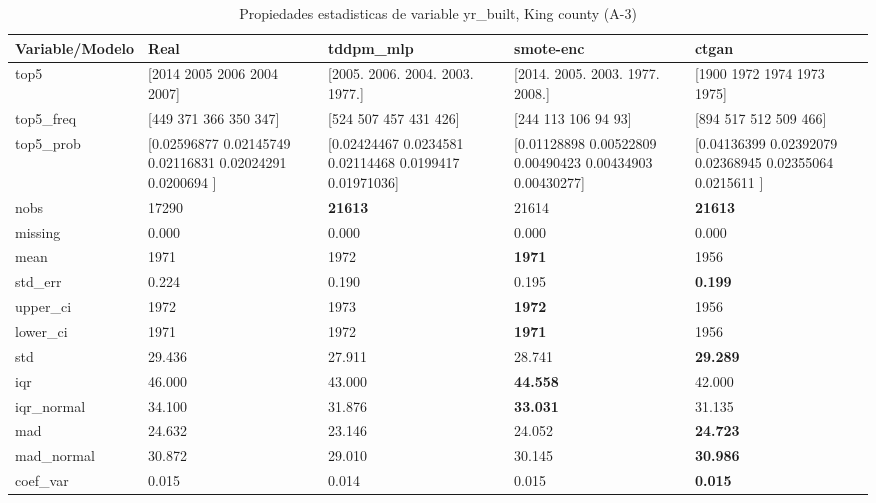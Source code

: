 \begin{table}[H]
\centering
\fontsize{8}{14}\selectfont
\caption{Propiedades  estadisticas de variable yr\_built, King county (A-3)}
\label{table-stats-king county-a-3-yr_built}
\begin{tabular}{|l|m{10em}|m{10em}|m{10em}|m{10em}|}
\hline
 \rowcolor[gray]{0.8}
Variable/Modelo & Real & tddpm\_mlp & smote-enc & ctgan \\
\hline top5 & [2014 2005 2006 2004 2007] & [2005. 2006. 2004. 2003. 1977.] & [2014. 2005. 2003. 1977. 2008.] & [1900 1972 1974 1973 1975] \\
\hline top5\_freq & [449 371 366 350 347] & [524 507 457 431 426] & [244 113 106  94  93] & [894 517 512 509 466] \\
\hline top5\_prob & [0.02596877 0.02145749 0.02116831 0.02024291 0.0200694 ] & [0.02424467 0.0234581  0.02114468 0.0199417  0.01971036] & [0.01128898 0.00522809 0.00490423 0.00434903 0.00430277] & [0.04136399 0.02392079 0.02368945 0.02355064 0.0215611 ] \\
\hline nobs & 17290 & \bfseries 21613 & \cellcolor[rgb]{0.9, 0.54, 0.52} 21614 & \bfseries 21613 \\
\hline missing & 0.000 & 0.000 & 0.000 & 0.000 \\
\hline mean & 1971 & 1972 & \bfseries 1971 & \cellcolor[rgb]{0.9, 0.54, 0.52} 1956 \\
\hline std\_err & 0.224 & \cellcolor[rgb]{0.9, 0.54, 0.52} 0.190 & 0.195 & \bfseries 0.199 \\
\hline upper\_ci & 1972 & 1973 & \bfseries 1972 & \cellcolor[rgb]{0.9, 0.54, 0.52} 1956 \\
\hline lower\_ci & 1971 & 1972 & \bfseries 1971 & \cellcolor[rgb]{0.9, 0.54, 0.52} 1956 \\
\hline std & 29.436 & \cellcolor[rgb]{0.9, 0.54, 0.52} 27.911 & 28.741 & \bfseries 29.289 \\
\hline iqr & 46.000 & 43.000 & \bfseries 44.558 & \cellcolor[rgb]{0.9, 0.54, 0.52} 42.000 \\
\hline iqr\_normal & 34.100 & 31.876 & \bfseries 33.031 & \cellcolor[rgb]{0.9, 0.54, 0.52} 31.135 \\
\hline mad & 24.632 & \cellcolor[rgb]{0.9, 0.54, 0.52} 23.146 & 24.052 & \bfseries 24.723 \\
\hline mad\_normal & 30.872 & \cellcolor[rgb]{0.9, 0.54, 0.52} 29.010 & 30.145 & \bfseries 30.986 \\
\hline coef\_var & 0.015 & \cellcolor[rgb]{0.9, 0.54, 0.52} 0.014 & 0.015 & \bfseries 0.015 \\

\end{tabular}
\end{table}
